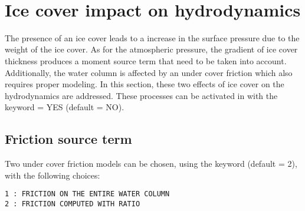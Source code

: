 ~\newline
\section{Ice cover impact on hydrodynamics}
\label{section:impact_on_hydro}

The presence of an ice cover leads to a increase in the surface pressure due to the weight of the ice cover.
As for the atmospheric pressure, the gradient of ice cover thickness produces a moment source term that need to be taken into account.
Additionally, the water column is affected by an under cover friction which also requires proper modeling.
In this section, these two effects of ice cover on the hydrodynamics are addressed. These processes can be activated in \khione with the keyword  = YES (default = NO).

\subsection{Friction source term}

Two under cover friction models can be chosen, using the keyword  (default = 2), with the following choices:

\begin{lstlisting}
1 : FRICTION ON THE ENTIRE WATER COLUMN
2 : FRICTION COMPUTED WITH RATIO
\end{lstlisting}

